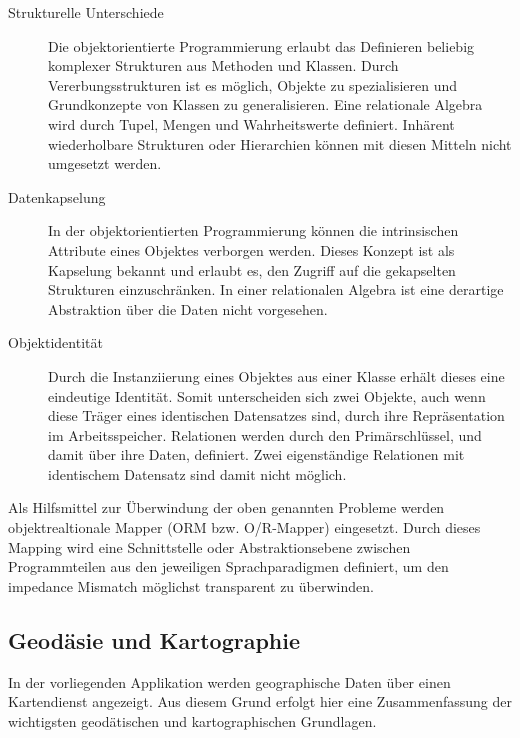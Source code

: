 \begin{description}
 \item [Strukturelle Unterschiede]
 Die objektorientierte Programmierung erlaubt das Definieren beliebig komplexer Strukturen aus Methoden und Klassen. Durch Vererbungsstrukturen ist es möglich, Objekte zu spezialisieren und Grundkonzepte von Klassen zu generalisieren. Eine relationale Algebra wird durch Tupel, Mengen und Wahrheitswerte definiert. Inhärent wiederholbare Strukturen oder Hierarchien können mit diesen Mitteln nicht umgesetzt werden.

 \item [Datenkapselung]
 In der objektorientierten Programmierung können die intrinsischen Attribute eines Objektes verborgen werden. Dieses Konzept ist als Kapselung bekannt und erlaubt es, den Zugriff auf die gekapselten Strukturen einzuschränken. In einer relationalen Algebra ist eine derartige Abstraktion über die Daten nicht vorgesehen.


 \item [Objektidentität]
 Durch die Instanziierung eines Objektes aus einer Klasse erhält dieses eine eindeutige Identität. Somit unterscheiden sich zwei Objekte, auch wenn diese Träger eines identischen Datensatzes sind, durch ihre Repräsentation im Arbeitsspeicher. Relationen werden durch den Primärschlüssel, und damit über ihre Daten, definiert. Zwei eigenständige Relationen mit identischem Datensatz sind damit nicht möglich.
\end{description}


Als Hilfsmittel zur Überwindung der oben genannten Probleme werden objektrealtionale Mapper (ORM bzw. O/R-Mapper) eingesetzt. Durch dieses Mapping wird eine Schnittstelle oder Abstraktionsebene zwischen Programmteilen aus den jeweiligen Sprachparadigmen definiert, um den impedance Mismatch möglichst transparent zu überwinden.






\subsection{Geodäsie und Kartographie}

In der vorliegenden Applikation werden geographische Daten über einen Kartendienst angezeigt. Aus diesem Grund erfolgt hier eine Zusammenfassung der wichtigsten geodätischen und kartographischen Grundlagen.


